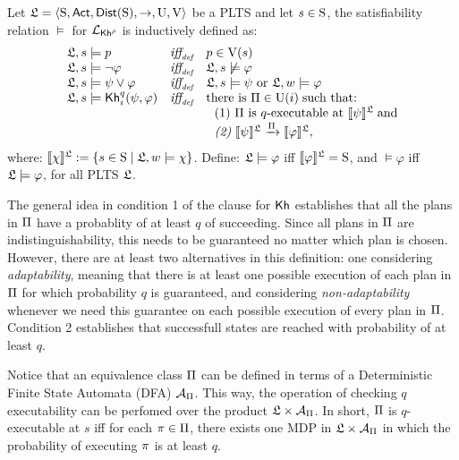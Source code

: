 \begin{definition} \label{def:semantics}
    Let $\model = \tup{\S,\ACT,\dist(\S),\ra,\Unc,\V}$ be a PLTS and let $s\in\S$, the satisfiability relation $\models$ for $\PKh$ is inductively defined as:
    \[
    \begin{array}{l@{\ \ \ }c@{\ \ \  }l}
    \model, s \models p & \iffdef & p \in \V(s) \\
    \model, s\models \neg\varphi & \iffdef & \model, s \not\models \varphi \\
    \model, s \models \psi\vee\varphi & \iffdef & \model, s \models \psi \mbox{ or }\model, w \models \varphi \\
    \model, s \models \kh_i^q(\psi,\varphi) & \iffdef & \text{there is } \plans \in \Unc(i) \;\text{such that:} \\
    & & \ \ \text{\rm (1)} \ \plans \text{ is $q$-executable at }  \truthset{\model}{\psi}\; \text{and} \\
    & & \ \ \text{\em (2)} \ \truthset{\model}{\psi} \reach{\plans} \truthset{\model}{\varphi}, 
    \end{array}
    \]     
    \noindent where: $\truthset{\model}{\chi} := \csetsc{s\in\S}{\model,w\models\chi}$. Define: $\model\models\varphi$ iff  $\truthset{\model}{\varphi}=\S$, and $\models\varphi$ iff $\model\models\varphi$, for all PLTS $\model$.
\end{definition}

The general idea in condition 1 of the clause for $\kh$ establishes that all the plans in $\plans$ have a probablity of at least $q$ of succeeding. Since all plans in $\plans$ are indistinguishability, this needs to be guaranteed no matter which plan is chosen. However, there are at least two alternatives in this definition: one considering \emph{adaptability}, meaning that there is at least one possible execution of each plan in $\plans$ for which probability $q$ is guaranteed, and considering \emph{non-adaptability} whenever we need this guarantee on each possible execution of every plan in $\plans$. Condition 2 establishes that successfull states are reached with probability of at least $q$.

\begin{remark}
    Notice that an equivalence class $\plans$ can be defined in terms of a Deterministic Finite State Automata (DFA) $\mathcal{A}_{\plans}$. This way, the operation of checking $q$ executability can be perfomed over the product $\model\times\mathcal{A}_{\plans}$. In short, $\plans$ is $q$-executable at $s$ iff for each $\plan\in\plans$, there exists one MDP in  $\model\times\mathcal{A}_{\plans}$ in which the probability of executing $\plan$ is at least $q$.
\end{remark}
